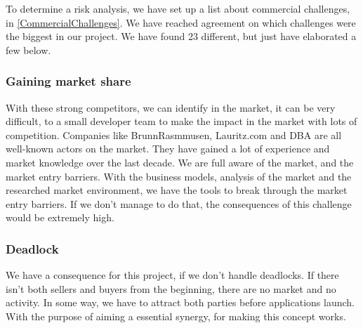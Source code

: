 To determine a risk analysis, we have set up a list about commercial challenges, in \ref{CommercialChallenges}. We have reached agreement on which challenges were the biggest in our project. We have found 23 different, but just have elaborated a few below.

\subsubsection{Gaining market share}
With these strong competitors, we can identify in the market, it can be very difficult, to a small developer team to make the impact in the market with lots of competition. Companies like BrunnRasmmusen, Lauritz.com and DBA are all well-known actors on the market. They have gained a lot of experience and market knowledge over the last decade. We are full aware of the market, and the market entry barriers. With the business models, analysis of the market and the researched market environment, we have the tools to break through the market entry barriers. If we don't manage to do that, the consequences of this challenge would be extremely high.

\subsubsection{Deadlock}
We have a consequence for this project, if we don't handle deadlocks. If there isn't both sellers and buyers from the beginning, there are no market and no activity. In some way, we have to attract both parties before applications launch. With the purpose of aiming a essential synergy, for making this concept works.